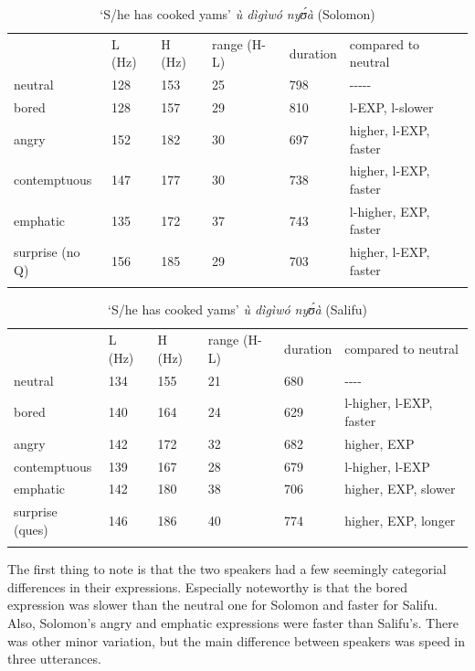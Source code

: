 \documentclass[output=paper]{langsci/langscibook}
\begin{document}
\begin{table}
\begin{tabular}{llllll} & L (Hz) & H (Hz) & range (H-L) & duration & compared to neutral\\
\lsptoprule
neutral & 128 & 153 & 25 & 798 & {}-{}-{}-{}-{}-\\
bored & 128 & 157 & 29 & 810 & l-EXP, l-slower\\
angry & 152 & 182 & 30 & 697 & higher, l-EXP, faster\\
contemptuous & 147 & 177 & 30 & 738 & higher, l-EXP, faster\\
emphatic & 135 & 172 & 37 & 743 & l-higher, EXP, faster\\
surprise (no Q) & 156 & 185 & 29 & 703 & higher, l-EXP, faster\\
\lspbottomrule
\end{tabular}

\caption{`S/he has cooked yams' \emph{ù dìgìwó nyʊ́à} (Solomon)}
\label{tab:3.cahill}

\end{table}



\begin{table}
\begin{tabular}{llllll} & L (Hz) & H (Hz) & range (H-L) & duration & compared to neutral\\
\lsptoprule
neutral & 134 & 155 & 21 & 680 & {}-{}-{}-{}-\\
bored & 140 & 164 & 24 & 629 & l-higher, l-EXP, faster\\
angry & 142 & 172 & 32 & 682 & higher, EXP\\
contemptuous & 139 & 167 & 28 & 679 & l-higher, l-EXP\\
emphatic & 142 & 180 & 38 & 706 & higher, EXP, slower\\
surprise (ques) & 146 & 186 & 40 & 774 & higher, EXP, longer\\
\lspbottomrule
\end{tabular}

\caption{`S/he has cooked yams' \emph{ù dìgìwó nyʊ́à} (Salifu)}
\label{tab:4.cahill}

\end{table}



The first thing to note is that the two speakers had a few seemingly categorial differences in their expressions. Especially noteworthy is that the bored expression was slower than the neutral one for Solomon and faster for Salifu. Also, Solomon's angry and emphatic expressions were faster than Salifu's. There was other minor variation, but the main difference between speakers was speed in three utterances.
\end{document}
